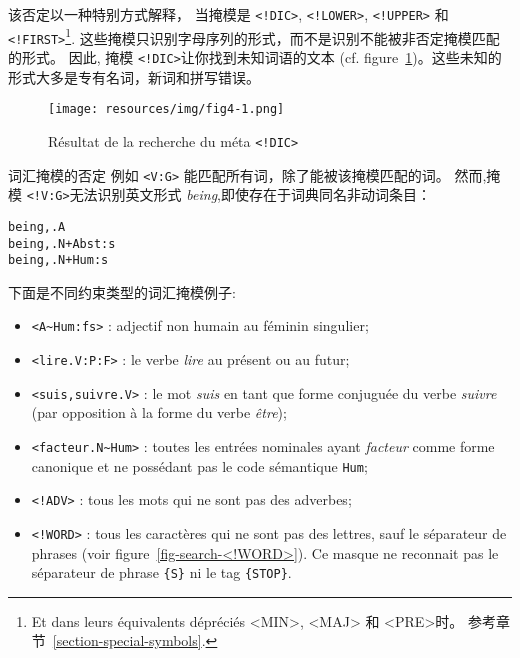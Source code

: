 \bigskip
\noindent 该否定以一种特别方式解释， 当掩模是 
\verb+<!DIC>+, \verb+<!LOWER>+, \verb+<!UPPER>+ 和
\verb+<!FIRST>+\footnote{Et dans leurs équivalents dépréciés <MIN>, <MAJ> 和
<PRE>时。 参考章节~\ref{section-special-symbols}.}.
 这些掩模只识别字母序列的形式，而不是识别不能被非否定掩模匹配的形式。 因此, 掩模 \verb+<!DIC>+让你找到未知词语的文本
 (cf. figure~\ref{fig-search-<!DIC>})。这些未知的形式大多是专有名词，新词和拼写错误。

\bigskip
\begin{figure}[h]
\begin{center}
\texttt{[image: resources/img/fig4-1.png]}
\caption{Résultat de la recherche du méta \texttt{<!DIC>}\label{fig-search-<!DIC>}}
\end{center}
\end{figure}

\bigskip
\noindent 词汇掩模的否定 例如 \verb+<V:G>+ 能匹配所有词，除了能被该掩模匹配的词。 然而,掩模 \verb+<!V:G>+无法识别英文形式 \emph{being},即使存在于词典同名非动词条目：


\begin{verbatim}
being,.A
being,.N+Abst:s
being,.N+Hum:s
\end{verbatim}

\noindent 下面是不同约束类型的词汇掩模例子:

\begin{itemize}
  \item \verb$<A~Hum:fs>$ : adjectif non humain au féminin singulier;
  \item \verb+<lire.V:P:F>+ : le verbe \textit{lire} au présent ou au futur;
  \item \verb$<suis,suivre.V>$ : le mot \textit{suis} en tant que forme conjuguée du verbe
  	  \textit{suivre}
  	  (par opposition à la forme du verbe \textit{être});
  \item \verb$<facteur.N~Hum>$ : toutes les entrées nominales ayant \textit{facteur} comme forme
  	  canonique et ne possédant pas le code sémantique \verb+Hum+;
  \item \verb$<!ADV>$ : tous les mots qui ne sont pas des adverbes;
  \item \verb$<!WORD>$ : tous les caractères qui ne sont pas des lettres, sauf le séparateur de
  	  phrases
  	  (voir figure~\ref{fig-search-<!WORD>}). Ce masque ne reconnait pas le séparateur de phrase
  	  \verb+{S}+
  	  ni le tag \verb+{STOP}+.
\end{itemize}

